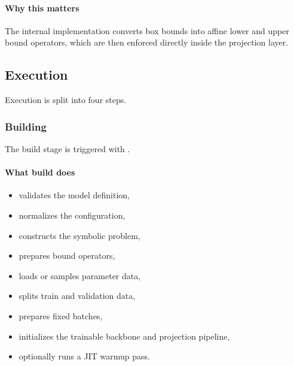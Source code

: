 \documentclass[letterpaper,10pt,english,openany,oneside]{sphinxmanual}
\begin{document}
\paragraph{Why this matters}
\label{\detokenize{api/package/constraints/box:why-this-matters}}
\sphinxAtStartPar
The internal implementation converts box bounds into affine lower and upper bound operators, which are then enforced directly inside the projection layer.

\sphinxstepscope


\subsection{Execution}
\label{\detokenize{api/package/execution/index:execution}}\label{\detokenize{api/package/execution/index::doc}}
\sphinxAtStartPar
Execution is split into four steps.

\sphinxstepscope


\subsubsection{Building}
\label{\detokenize{api/package/execution/building:building}}\label{\detokenize{api/package/execution/building::doc}}
\sphinxAtStartPar
The build stage is triggered with {\hyperref[\detokenize{api/package/object:nlpoptnet.api.NLPOptNet.build}]{}}.


\paragraph{What build does}
\label{\detokenize{api/package/execution/building:what-build-does}}\begin{itemize}
\item {} 
\sphinxAtStartPar
validates the model definition,

\item {} 
\sphinxAtStartPar
normalizes the configuration,

\item {} 
\sphinxAtStartPar
constructs the symbolic  problem,

\item {} 
\sphinxAtStartPar
prepares bound operators,

\item {} 
\sphinxAtStartPar
loads or samples parameter data,

\item {} 
\sphinxAtStartPar
splits train and validation data,

\item {} 
\sphinxAtStartPar
prepares fixed batches,

\item {} 
\sphinxAtStartPar
initializes the trainable backbone and projection pipeline,

\item {} 
\sphinxAtStartPar
optionally runs a JIT warmup pass.

\end{itemize}
\end{document}
